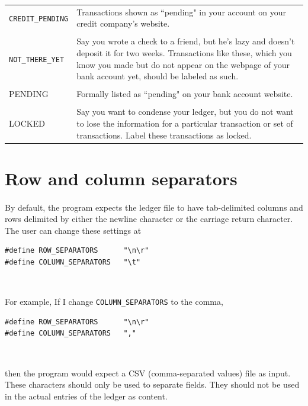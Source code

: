 \documentclass{article}
\providecommand{\q}{$\quad$ \newline}
\begin{document}
\begin{flushleft}
\begin{center}
\begin{tabular}{lp{11cm}}
{\tt CREDIT\_PENDING} & Transactions shown as ``pending" in your account on your credit company's website. \\ \\

{\tt NOT\_THERE\_YET} & Say you wrote a check to a friend, but he's lazy and doesn't deposit it for two weeks. Transactions like these, which you know you made but do not appear on the webpage of your bank account yet, should be labeled as such. \\ \\

PENDING & Formally listed as ``pending" on your bank account website. \\ \\

LOCKED & Say you want to condense your ledger, but you do not want to lose the information for a particular transaction or set of transactions. Label these transactions as locked.
 
\end{tabular}
\end{center}



\section{Row and column separators}

\paragraph{} By default, the program expects the ledger file to have tab-delimited columns and rows delimited by either the newline character or the carriage return character. The user can change these settings at  \q

\begin{lstlisting}
#define ROW_SEPARATORS      "\n\r"
#define COLUMN_SEPARATORS   "\t" 
\end{lstlisting} \q

For example, If I change {\tt COLUMN\_SEPARATORS} to the comma, \q

\begin{lstlisting}
#define ROW_SEPARATORS      "\n\r"
#define COLUMN_SEPARATORS   "," 
\end{lstlisting} \q

then the program would expect a CSV (comma-separated values) file as input. These characters should only be used to separate fields. They should not be used in the actual entries of the ledger as content.




\end{flushleft}
\end{document}
